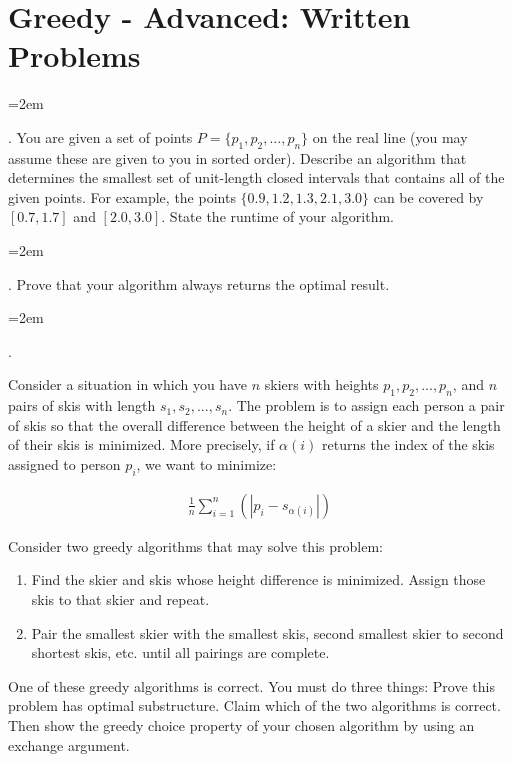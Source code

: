 \documentclass[12pt]{article}
\def\homework{Greedy - Advanced: Written Problems}
\newcounter{quesnum}
\newcommand{\question}[2][??]{
\begin{list}{\labelitemi}{\leftmargin=2em}
\item [\arabic{quesnum}.] {} {#2}
\end{list}
\addtocounter{quesnum}{1}
}
\newcommand{\answer}[2][??]{
\ifthenelse{\boolean{solution}}{
\color{red} #2 \color{black}}
{\vspace*{#1}}
}
\begin{document}
\section*{\homework}


\question[2]{
You are given a set of points $P=\{ p_1, p_2, ... , p_n \}$ on the real line (you may assume these are given to you in sorted order). Describe an algorithm that determines the smallest set of unit-length closed intervals that contains all of the given points. For example, the points $\{ 0.9, 1.2, 1.3, 2.1, 3.0 \}$ can be covered by $[ 0.7, 1.7 ]$ and $[ 2.0, 3.0 ]$. State the runtime of your algorithm.
}



\question[3]{
Prove that your algorithm always returns the optimal result.
}

\answer[0 in]{
...
}



\question[2]{
Consider a situation in which you have $n$ skiers with heights $p_1,p_2,...,p_n$, and $n$ pairs of skis with length $s_1,s_2,...,s_n$. The problem is to assign each person a pair of skis so that the overall difference between the height of a skier and the length of their skis is minimized. More precisely, if $\alpha(i)$ returns the index of the skis assigned to person $p_i$, we want to minimize:

\begin{align*}
\frac{1}{n}\sum_{i=1}^{n}(|p_i - s_{\alpha(i)}|)
\end{align*}

Consider two greedy algorithms that may solve this problem:

\begin{enumerate}
\item Find the skier and skis whose height difference is minimized. Assign those skis to that skier and repeat.
\item Pair the smallest skier with the smallest skis, second smallest skier to second shortest skis, etc. until all pairings are complete.
\end{enumerate}

One of these greedy algorithms is correct. You must do three things: Prove this problem has optimal substructure. Claim which of the two algorithms is correct. Then show the greedy choice property of your chosen algorithm by using an exchange argument.
}
\end{document}

